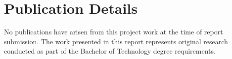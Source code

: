 \clearpage %

\chapter{Publication Details}
No publications have arisen from this project work at the time of
report submission. The work presented in this report represents
original research conducted as part of the Bachelor of Technology
degree requirements.





\pagebreak

